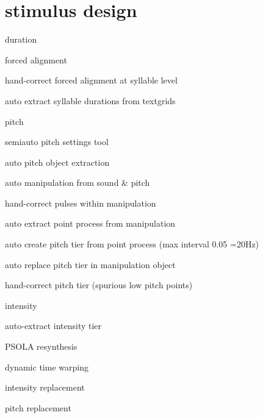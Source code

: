 \section{stimulus design}
\begin{itm}
	\item{duration}
	\begin{itm}
		\item{forced alignment}
		\item{hand-correct forced alignment at syllable level}
		\item{auto extract syllable durations from textgrids}
	\end{itm}
	\item{pitch}
	\begin{itm}
		\item{semiauto pitch settings tool}
		\item{auto pitch object extraction}
		\item{auto manipulation from sound & pitch}
		\item{hand-correct pulses within manipulation}
		\item{auto extract point process from manipulation}
		\item{auto create pitch tier from point process (max interval 0.05 =20Hz)}
		\item{auto replace pitch tier in manipulation object}
		\item{hand-correct pitch tier (spurious low pitch points)}
	\end{itm}
	\item{intensity}
	\begin{itm}
		\item{auto-extract intensity tier}
	\end{itm}
	\item{PSOLA resynthesis}
	\begin{itm}
		\item{dynamic time warping}
		\item{intensity replacement}
		\item{pitch replacement}
	\end{itm}	
\end{itm}


